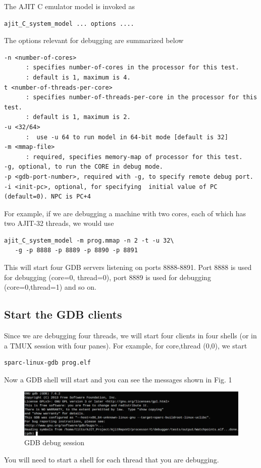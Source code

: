 \documentclass[a4paper, 11pt]{article}
\begin{document}
The AJIT C emulator model is invoked as
\begin{verbatim}
ajit_C_system_model ... options ....
\end{verbatim}
The  options relevant for debugging are summarized below
\begin{verbatim}
-n <number-of-cores>     
      : specifies number-of-cores in the processor for this test.
      : default is 1, maximum is 4.
t <number-of-threads-per-core>     
      : specifies number-of-threads-per-core in the processor for this test.
      : default is 1, maximum is 2.
-u <32/64>
      :  use -u 64 to run model in 64-bit mode [default is 32]
-m <mmap-file>     
      : required, specifies memory-map of processor for this test.
-g, optional, to run the CORE in debug mode.
-p <gdb-port-number>, required with -g, to specify remote debug port.
-i <init-pc>, optional, for specifying  initial value of PC (default=0). NPC is PC+4
\end{verbatim}
For example, if we are debugging a machine with two cores, each of which has 
two AJIT-32 threads, we would use
\begin{verbatim}
ajit_C_system_model -m prog.mmap -n 2 -t -u 32\
   -g -p 8888 -p 8889 -p 8890 -p 8891 
\end{verbatim}
This will start four GDB servers  listening on ports 8888-8891.  Port 8888 is used for 
debugging (core=0, thread=0), port 8889 is used for debugging (core=0,thread=1) and
so on.

\subsection{Start the GDB clients}

Since we are debugging four threads, we will start four clients in four shells
(or in a TMUX session with four panes).  For example, for core,thread (0,0), we
start
\begin{verbatim}
sparc-linux-gdb prog.elf
\end{verbatim}
Now a GDB shell will start and you can see the messages shown in Fig. 1
\begin{figure}[H]
		\centering
		\includegraphics[width=0.8\columnwidth]{Figs/first.png}
		\caption{GDB debug session}
\end{figure}
You will need to start a shell for each thread that you are debugging.
\end{document}
